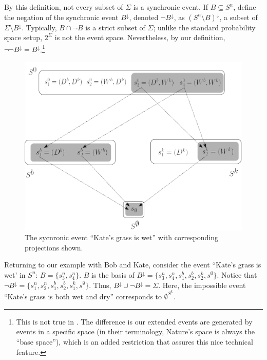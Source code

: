 \documentclass[
11pt,
titlepage,
reqno,
]{article}%
\theoremstyle{definition}
\begin{document}
By this definition, not every subset of $\Sigma$ is a synchronic event.
If $B\subseteq S^n$, define the negation of the synchronic event $B^{\downarrow}$, denoted $\lnot B^{\downarrow}$, as $(S^n\setminus B)^{\downarrow}$,  a  subset of $\Sigma\setminus B^{\downarrow}$.
Typically, $B\cap \lnot B$ is a strict subset of $\Sigma$; unlike the standard probability space setup, $2^\Sigma$ is not the event space.
Nevertheless, by our definition, $\lnot\lnot B^\downarrow = B^\downarrow$.\footnote
{
	This is not true in \citet{Heifetz2006}.
		The difference is our extended events are generated by events in a specific space (in their terminology, Nature's space is always the ``base space''), which is an added restriction that assures this nice technical feature.
}

\begin{figure}[h!]	
	\begin{center}
		\includegraphics[scale=.4]{lattice-event.png}
	\end{center}
	\caption{The sycnronic event ``Kate's grass is wet'' with corresponding projections shown.\label{lattice-event}}
\end{figure}
	
Returning to our example with Bob and Kate, consider the event ``Kate's grass is wet' in $S^n$: $B=\{s^n_3,s^n_4\}$.
$B$ is the basis of $B^{\downarrow}=\{s^n_3,s^n_4,s^b_1,s^b_2,s^k_2,s^\emptyset\}$.
Notice that $\lnot B^{\downarrow}=\{s^n_1,s^n_2,s^b_1,s^b_2,s^k_1,s^\emptyset\}$.
Thus, $B^{\downarrow}\cup \lnot B^{\downarrow}=\Sigma$.
Here, the impossible event ``Kate's grass is both wet and dry'' corresponds to $\emptyset^{S^k}$.
\end{document}

